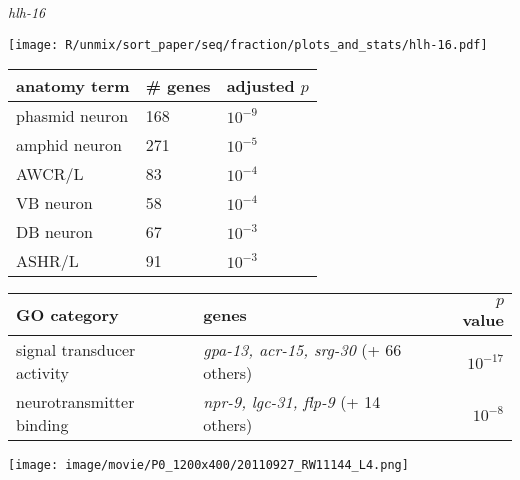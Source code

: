 \documentclass[serif,9pt]{beamer}
\begin{document}
\begin{frame}{{\em hlh-16}}

\begin{minipage}{0.4\textwidth}
\texttt{[image: R/unmix/sort\_paper/seq/fraction/plots\_and\_stats/hlh-16.pdf]}
\end{minipage}
\begin{minipage}{0.58\textwidth}
\begin{table}[!tbp]\scriptsize
\begin{tabular}{lll}
anatomy term & \# genes & adjusted $p$ \\
\hline
phasmid neuron & 168 & $10^{-9}$ \\
amphid neuron & 271 & $10^{-5}$ \\
AWCR/L & 83 & $10^{-4}$ \\
VB neuron & 58 & $10^{-4}$ \\
DB neuron & 67 & $10^{-3}$ \\
ASHR/L & 91 & $10^{-3}$ \\
\hline

\end{tabular}
\end{table}
\end{minipage}

\begin{table}\footnotesize
\begin{tabular}{llr}
GO category & genes & $p$ value \\
\hline
signal transducer activity & {\em gpa-13, acr-15, srg-30} (+ 66 others) & $10^{-17}$ \\
neurotransmitter binding & {\em npr-9, lgc-31, flp-9} (+ 14 others) & $10^{-8}$ \\
\end{tabular}
\end{table}

\texttt{[image: image/movie/P0\_1200x400/20110927\_RW11144\_L4.png]}

\end{frame}
\end{document}
